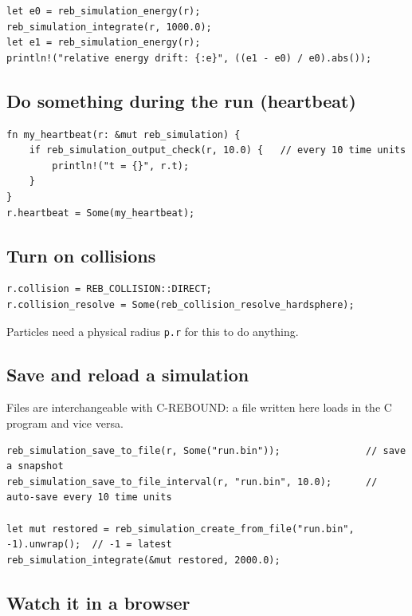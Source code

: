\documentclass[11pt]{article}
\begin{document}
\begin{lstlisting}
let e0 = reb_simulation_energy(r);
reb_simulation_integrate(r, 1000.0);
let e1 = reb_simulation_energy(r);
println!("relative energy drift: {:e}", ((e1 - e0) / e0).abs());
\end{lstlisting}

\subsection{Do something during the run (heartbeat)}

\begin{lstlisting}
fn my_heartbeat(r: &mut reb_simulation) {
    if reb_simulation_output_check(r, 10.0) {   // every 10 time units
        println!("t = {}", r.t);
    }
}
r.heartbeat = Some(my_heartbeat);
\end{lstlisting}

\subsection{Turn on collisions}

\begin{lstlisting}
r.collision = REB_COLLISION::DIRECT;
r.collision_resolve = Some(reb_collision_resolve_hardsphere);
\end{lstlisting}

Particles need a physical radius \texttt{p.r} for this to do anything.

\subsection{Save and reload a simulation}

Files are interchangeable with C-REBOUND: a file written here loads in the C program and vice versa.

\begin{lstlisting}
reb_simulation_save_to_file(r, Some("run.bin"));               // save a snapshot
reb_simulation_save_to_file_interval(r, "run.bin", 10.0);      // auto-save every 10 time units

let mut restored = reb_simulation_create_from_file("run.bin", -1).unwrap();  // -1 = latest
reb_simulation_integrate(&mut restored, 2000.0);
\end{lstlisting}

\subsection{Watch it in a browser}
\end{document}
